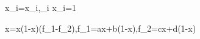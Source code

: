 \dot x_i=x_i\left[(Ax)_i-x^{T}Ax\right],\qquad \sum_i x_i=1

\dot x=x(1-x)(f_1-f_2),\qquad f_1=ax+b(1-x),\quad f_2=cx+d(1-x)
